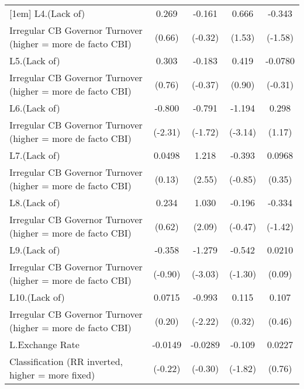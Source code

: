 {\begin{tabular}{l*{4}{c}}
[1em]
L4.(Lack of)        &       0.269         &      -0.161         &       0.666         &      -0.343         \\
Irregular CB Governor Turnover (higher = more de facto CBI)&      (0.66)         &     (-0.32)         &      (1.53)         &     (-1.58)         \\
[1em]
L5.(Lack of)        &       0.303         &      -0.183         &       0.419         &     -0.0780         \\
Irregular CB Governor Turnover (higher = more de facto CBI)&      (0.76)         &     (-0.37)         &      (0.90)         &     (-0.31)         \\
[1em]
L6.(Lack of)        &      -0.800\sym{*}  &      -0.791         &      -1.194\sym{**} &       0.298         \\
Irregular CB Governor Turnover (higher = more de facto CBI)&     (-2.31)         &     (-1.72)         &     (-3.14)         &      (1.17)         \\
[1em]
L7.(Lack of)        &      0.0498         &       1.218\sym{*}  &      -0.393         &      0.0968         \\
Irregular CB Governor Turnover (higher = more de facto CBI)&      (0.13)         &      (2.55)         &     (-0.85)         &      (0.35)         \\
[1em]
L8.(Lack of)        &       0.234         &       1.030\sym{*}  &      -0.196         &      -0.334         \\
Irregular CB Governor Turnover (higher = more de facto CBI)&      (0.62)         &      (2.09)         &     (-0.47)         &     (-1.42)         \\
[1em]
L9.(Lack of)        &      -0.358         &      -1.279\sym{**} &      -0.542         &      0.0210         \\
Irregular CB Governor Turnover (higher = more de facto CBI)&     (-0.90)         &     (-3.03)         &     (-1.30)         &      (0.09)         \\
[1em]
L10.(Lack of)       &      0.0715         &      -0.993\sym{*}  &       0.115         &       0.107         \\
Irregular CB Governor Turnover (higher = more de facto CBI)&      (0.20)         &     (-2.22)         &      (0.32)         &      (0.46)         \\
[1em]
L.Exchange Rate     &     -0.0149         &     -0.0289         &      -0.109         &      0.0227         \\
Classification (RR inverted, higher = more fixed)&     (-0.22)         &     (-0.30)         &     (-1.82)         &      (0.76)         \\

\end{tabular}}
